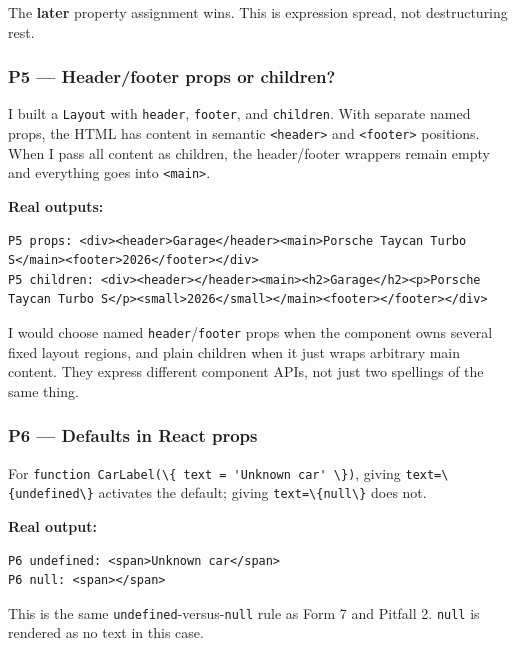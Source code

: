 \documentclass[
  9pt,
]{article}
\newcommand{\passthrough}[1]{#1}
\begin{document}
The \textbf{later} property assignment wins. This is expression spread,
not destructuring rest.

\subsubsection{P5 --- Header/footer props or
children?}\label{p5-headerfooter-props-or-children}

I built a \passthrough{\lstinline!Layout!} with
\passthrough{\lstinline!header!}, \passthrough{\lstinline!footer!}, and
\passthrough{\lstinline!children!}. With separate named props, the HTML
has content in semantic \passthrough{\lstinline!<header>!} and
\passthrough{\lstinline!<footer>!} positions. When I pass all content as
children, the header/footer wrappers remain empty and everything goes
into \passthrough{\lstinline!<main>!}.

\textbf{Real outputs:}

\begin{lstlisting}
P5 props: <div><header>Garage</header><main>Porsche Taycan Turbo S</main><footer>2026</footer></div>
P5 children: <div><header></header><main><h2>Garage</h2><p>Porsche Taycan Turbo S</p><small>2026</small></main><footer></footer></div>
\end{lstlisting}

I would choose named
\passthrough{\lstinline!header!}/\passthrough{\lstinline!footer!} props
when the component owns several fixed layout regions, and plain children
when it just wraps arbitrary main content. They express different
component APIs, not just two spellings of the same thing.

\subsubsection{P6 --- Defaults in React
props}\label{p6-defaults-in-react-props}

For
\passthrough{\lstinline!function CarLabel(\{ text = 'Unknown car' \})!},
giving \passthrough{\lstinline!text=\{undefined\}!} activates the
default; giving \passthrough{\lstinline!text=\{null\}!} does not.

\textbf{Real output:}

\begin{lstlisting}
P6 undefined: <span>Unknown car</span>
P6 null: <span></span>
\end{lstlisting}

This is the same
\passthrough{\lstinline!undefined!}-versus-\passthrough{\lstinline!null!}
rule as Form 7 and Pitfall 2. \passthrough{\lstinline!null!} is rendered
as no text in this case.
\end{document}
